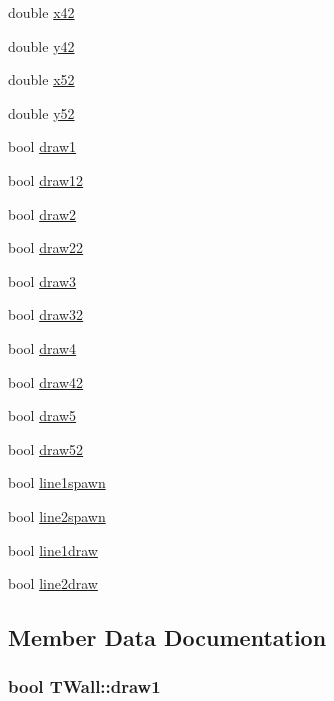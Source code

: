 \begin{DoxyCompactItemize}
\item 
double \hyperlink{struct_t_wall_af421a7bf81b965ff8de10bf72be9177f}{x42}
\item 
double \hyperlink{struct_t_wall_a56fb37ad512958d7b1f77e870cc214ad}{y42}
\item 
double \hyperlink{struct_t_wall_a31886c55f83e686db56d59ec1925ebc1}{x52}
\item 
double \hyperlink{struct_t_wall_ac51217cd6c93f58347798b269ac2f4ab}{y52}
\item 
bool \hyperlink{struct_t_wall_a052d835638c94f9568446ed04daaa2ce}{draw1}
\item 
bool \hyperlink{struct_t_wall_ae1663f06750529b3c91f41719a91a617}{draw12}
\item 
bool \hyperlink{struct_t_wall_a840e9f598ea36439a58e14c9db67b1c7}{draw2}
\item 
bool \hyperlink{struct_t_wall_af847bc59074bbe1397b7acce3a2d82be}{draw22}
\item 
bool \hyperlink{struct_t_wall_a557f2866f5f066b59090d653cd5fca13}{draw3}
\item 
bool \hyperlink{struct_t_wall_a8d11657dcc8cdff0d2463611664a7d1c}{draw32}
\item 
bool \hyperlink{struct_t_wall_a29e4886aa09bd987d9dc4326a4df06e5}{draw4}
\item 
bool \hyperlink{struct_t_wall_a92238d91abe22e5a68d1f31aac460c71}{draw42}
\item 
bool \hyperlink{struct_t_wall_ab39b629b98515f3a536b9d2597c0af80}{draw5}
\item 
bool \hyperlink{struct_t_wall_a4c6a5a2b6f2efd878e7fe548bd27e0bd}{draw52}
\item 
bool \hyperlink{struct_t_wall_acfff05e6cece221677a43c4b26558ab7}{line1spawn}
\item 
bool \hyperlink{struct_t_wall_ae1c857c04d8158d7f35c16463a6d5171}{line2spawn}
\item 
bool \hyperlink{struct_t_wall_a6c98659a446ce4de7239cc25f64dd6ab}{line1draw}
\item 
bool \hyperlink{struct_t_wall_aef14bd1ce8936d89f5b93baf38282481}{line2draw}
\end{DoxyCompactItemize}


\subsection{Member Data Documentation}
\subsubsection[{\texorpdfstring{draw1}{draw1}}]{\setlength{\rightskip}{0pt plus 5cm}bool T\+Wall\+::draw1}\hypertarget{struct_t_wall_a052d835638c94f9568446ed04daaa2ce}{}\label{struct_t_wall_a052d835638c94f9568446ed04daaa2ce}
